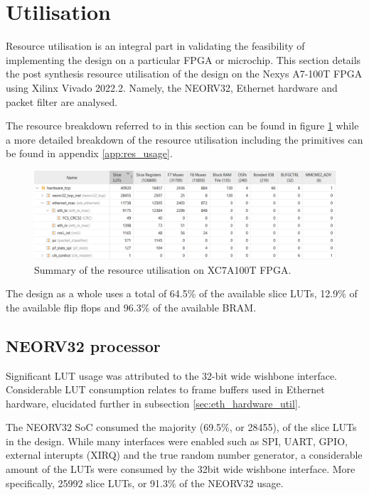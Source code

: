 \section{Utilisation}

Resource utilisation is an integral part in validating the feasibility of implementing the design on a particular FPGA or microchip. This section details the post synthesis resource utilisation of the design on the Nexys A7-100T FPGA using Xilinx Vivado 2022.2. Namely, the NEORV32, Ethernet hardware and packet filter are analysed.


The resource breakdown referred to in this section can be found in figure \ref{fig:resource_util} while a more detailed breakdown of the resource utilisation including the primitives can be found in appendix \ref{app:res_usage}. 

\begin{figure}[h]
    \centering
    \includegraphics[width=1\textwidth]{Images/FPGAUtilisationResources.png}
    \caption[Summary of the resource utilisation on XC7A100T FPGA]{Summary of the resource utilisation on XC7A100T FPGA.}
    \label{fig:resource_util}
\end{figure}

 
The design as a whole uses a total of 64.5\% of the available slice LUTs, 12.9\% of the available flip flops and 96.3\% of the available BRAM.




\subsection{NEORV32 processor}

Significant LUT usage was attributed to the 32-bit wide wishbone interface. Considerable LUT consumption relates to frame buffers used in Ethernet hardware, elucidated further in subsection \ref{sec:eth_hardware_util}.


The NEORV32 SoC consumed the majority (69.5\%, or 28455), of the slice LUTs in the design. While many interfaces were enabled such as SPI, UART, GPIO, external interupts (XIRQ) and the true random number generator, a considerable amount of the LUTs were consumed by the 32bit wide wishbone interface. More specifically, 25992 slice LUTs, or 91.3\% of the NEORV32 usage. 

